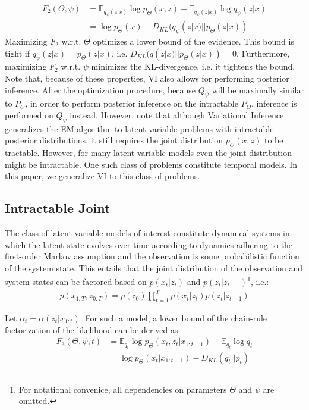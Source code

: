\begin{align*}
F_{2}(\Theta, \psi) &= \mathbb{E}_{q_\psi(z|x)} \log p_\Theta(x,z) - \mathbb{E}_{q_\psi(z|x)} \log q_\psi(z|x)\\
&=  \log p_\Theta(x) - D_{KL}(q_\psi(z|x) || p_\Theta(z|x))
\end{align*}
Maximizing $F_2$ w.r.t. $\Theta$ optimizes a lower bound of the evidence. This bound is tight if  $q_\psi(z|x)=p_\Theta(z|x)$, i.e. $D_{KL}(q(z|x) || p_\Theta(z|x)) = 0$. Furthermore, maximizing $F_2$ w.r.t. $\psi$ minimizes the KL-divergence, i.e. it tightens the bound. Note that, because of these properties, VI also allows for performing posterior inference. After the optimization procedure, because $Q_\psi$ will be maximally similar to $P_\Theta$, in order to perform posterior inference on the intractable $P_\Theta$, inference is performed on $Q_\psi$ instead. However, note that although Variational Inference generalizes the EM algorithm to latent variable problems with intractable posterior distributions, it still requires the joint distribution $p_\Theta(x,z)$ to be tractable. However, for many latent variable models even the joint distribution might be intractable. One such class of problems constitute temporal models. In this paper, we generalize VI to this class of problems.

\subsection{Intractable Joint}

The class of latent variable models of interest constitute dynamical systems in which the latent state evolves over time according to dynamics adhering to the first-order Markov assumption and the observation is some probabilistic function of the system state. This entails that the joint distribution of the observation and system states can be factored based on $p(x_t | z_t)$ and $p(z_t|z_{t-1})$\footnote{For notational convenice, all dependencies on parameters $\Theta$ and $\psi$ are omitted.}, i.e.:
\begin{align*}
p(x_{1:T}, z_{0:T}) = p(z_0) \prod_{t=1}^T p(x_t | z_t) p(z_t|z_{t-1})
\end{align*}

Let $\alpha_t = \alpha(z_t|x_{1:t})$. For such a model, a lower bound of the chain-rule factorization of the likelihood can be derived as:
\begin{align}
F_{3}(\Theta, \psi, t) &= \mathbb{E}_{q_t} \log p_\Theta(x_t,z_t|x_{1:t-1}) - \mathbb{E}_{q_t} \log q_t \label{f3}\\
&=  \log p_\Theta(x_t|x_{1:t-1}) - D_{KL}(q_t || p_t)
\end{align}


